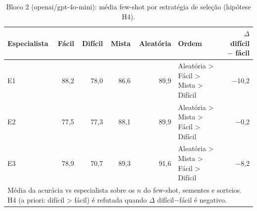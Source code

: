 \begin{table}[htbp]
\centering
\small
\caption{Bloco 2 (openai/gpt-4o-mini): média few-shot por estratégia de seleção (hipótese H4).}
\label{tab:bloco2_E_H4_media_fewshot_por_estrategia_gpt4mini}
\begin{tabular}{lrrrrlr}
\toprule
Especialista & Fácil & Difícil & Mista & Aleatória & Ordem & $\Delta$ difícil $-$ fácil \\
\midrule
E1 & 88,2 & 78,0 & 86,6 & 89,9 & Aleatória > Fácil > Mista > Difícil & $-$10,2 \\
E2 & 77,5 & 77,3 & 88,1 & 89,9 & Aleatória > Mista > Fácil > Difícil & $-$0,2 \\
E3 & 78,9 & 70,7 & 89,3 & 91,6 & Aleatória > Mista > Fácil > Difícil & $-$8,2 \\
\bottomrule
\multicolumn{7}{p{0.95\linewidth}}{\footnotesize Média da acurácia vs especialista sobre os $n$ do few-shot, sementes e sorteios. H4 (a priori: difícil > fácil) é refutada quando $\Delta$ difícil$-$fácil é negativo.} \\
\end{tabular}
\end{table}
